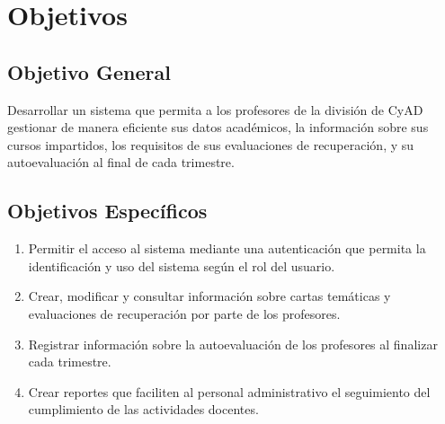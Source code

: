 \section{Objetivos}\label{sec:objetivos}
\justifying

\subsection{Objetivo General}
Desarrollar un sistema que permita a los profesores de la división de CyAD gestionar de manera eficiente sus datos académicos, la información sobre sus cursos impartidos, los requisitos de sus evaluaciones de recuperación, y su autoevaluación al final de cada trimestre.

\subsection{Objetivos Específicos}
\begin{enumerate}
	\item {Permitir el acceso al sistema mediante una autenticación que permita la identificación y uso del sistema según el rol del usuario.}
	\item {Crear, modificar y consultar información sobre cartas temáticas y evaluaciones de recuperación por parte de los profesores.}
	\item {Registrar información sobre la autoevaluación de los profesores al finalizar cada trimestre.}
    \item {Crear reportes que faciliten al personal administrativo el seguimiento del cumplimiento de las actividades docentes.}
    
\end{enumerate}

\newpage
